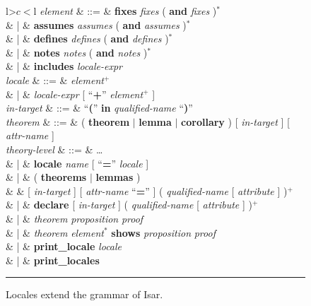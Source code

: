 \begin{isabellebody}
\begin{isamarkuptext}
\begin{figure}
\begin{small}
\begin{tabular}{l>$c<$l}
  \textit{element} & ::=
  & \textbf{fixes} \textit{fixes} ( \textbf{and} \textit{fixes} )$^*$ \\
  & |
  & \textbf{assumes} \textit{assumes} ( \textbf{and} \textit{assumes} )$^*$ \\
  & |
  & \textbf{defines} \textit{defines} ( \textbf{and} \textit{defines} )$^*$ \\
  & |
  & \textbf{notes} \textit{notes} ( \textbf{and} \textit{notes} )$^*$ \\
  & | & \textbf{includes} \textit{locale-expr} \\

  \textit{locale} & ::=
  & \textit{element}$^+$ \\
  & | & \textit{locale-expr} [ ``\textbf{+}'' \textit{element}$^+$ ] \\

  \textit{in-target} & ::=
  & ``\textbf{(}'' \textbf{in} \textit{qualified-name} ``\textbf{)}'' \\

  \textit{theorem} & ::= & ( \textbf{theorem} $|$ \textbf{lemma} $|$
    \textbf{corollary} ) [ \textit{in-target} ] [ \textit{attr-name} ] \\

  \textit{theory-level} & ::= & \ldots \\
  & | & \textbf{locale} \textit{name} [ ``\textbf{=}''
    \textit{locale} ] \\
  & | & ( \textbf{theorems} $|$ \textbf{lemmas} ) \\
  & & [ \textit{in-target} ] [ \textit{attr-name} ``\textbf{=}'' ]
    ( \textit{qualified-name} [ \textit{attribute} ] )$^+$ \\
  & | & \textbf{declare} [ \textit{in-target} ] ( \textit{qualified-name}
    [ \textit{attribute} ] )$^+$ \\
  & | & \textit{theorem} \textit{proposition} \textit{proof} \\
  & | & \textit{theorem} \textit{element}$^*$
    \textbf{shows} \textit{proposition} \textit{proof} \\
  & | & \textbf{print\_locale} \textit{locale} \\
  & | & \textbf{print\_locales}
  \end{tabular}
  \end{small}
  \vspace{2ex}
  \hrule
  \caption{Locales extend the grammar of Isar.}
  \label{fig-grammar}
  \end{figure}


\end{isamarkuptext}
\end{isabellebody}
